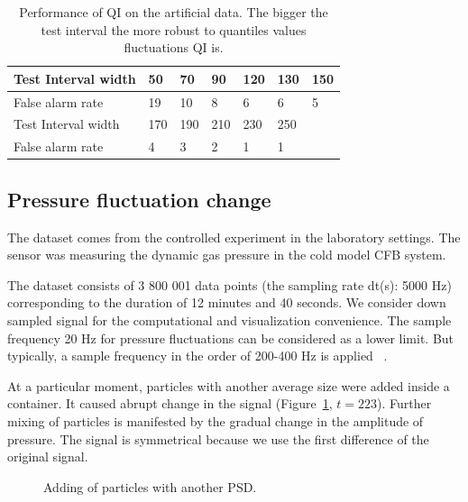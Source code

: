 \begin{table}[htb!]
\caption{Performance of QI on the artificial data. The bigger the test interval the more robust to quantiles values fluctuations QI is.}
\begin{tabular}{|l|l|l|l|l|l|l|}
\hline
	Test Interval width            & 50  & 70  & 90  & 120 & 130 & 150 \\ \hline
	False alarm rate & 19  & 10  & 8   & 6   & 6   & 5   \\ \hline
	Test Interval width			 & 170 & 190 & 210 & 230 & 250 &     \\ \hline
	False alarm rate & 4   & 3   & 2   & 1   & 1   &     \\
\hline
\end{tabular}
\label{Table1}
\end{table}

\subsection{Pressure fluctuation change}

The dataset comes from the controlled experiment in the laboratory settings. The sensor was measuring the dynamic gas pressure in the cold model CFB system.

The dataset consists of 3 800 001 data points (the sampling rate dt(s): 5000 Hz) corresponding to the duration of 12 minutes and 40 seconds.
We consider down sampled signal for the computational and visualization convenience.
The sample frequency 20 Hz for pressure fluctuations can be considered as a lower limit.
But typically, a sample frequency in the order of 200-400 Hz is applied ~\cite{vanOmmen2011403}.

At a particular moment, particles with another average size were added inside a container.
It caused abrupt change in the signal (Figure~\ref{fig:psd_change}, $t=223$). Further mixing of particles is manifested by the gradual change in the amplitude of pressure. The signal is symmetrical because we use the first difference of the original signal.

\begin{figure}[htb!]
\caption{Adding of particles with another PSD.}\label{fig:psd_change}
\end{figure}


